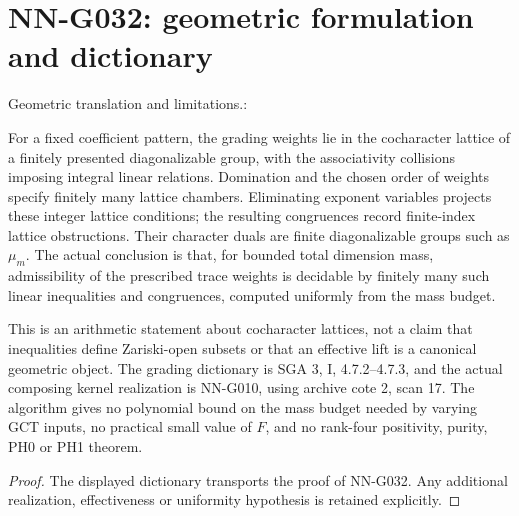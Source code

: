 \section{NN-G032: geometric formulation and dictionary}
\begin{geometricstatement}[NN-G032]
Geometric translation and limitations.:

For a fixed coefficient pattern, the grading weights lie
in the cocharacter lattice of a finitely presented
diagonalizable group, with the associativity collisions
imposing integral linear relations. Domination and the
chosen order of weights specify finitely many lattice
chambers. Eliminating exponent variables projects these
integer lattice conditions; the resulting congruences
record finite-index lattice obstructions. Their character
duals are finite diagonalizable groups such as $\mu_m$.
The actual conclusion is that, for bounded total dimension
mass, admissibility of the prescribed trace weights is
decidable by finitely many such linear inequalities and
congruences, computed uniformly from the mass budget.

This is an arithmetic statement about cocharacter lattices,
not a claim that inequalities define Zariski-open subsets
or that an effective lift is a canonical geometric object.
The grading dictionary is SGA 3, I, 4.7.2--4.7.3, and
the actual composing kernel realization is NN-G010,
using archive cote 2, scan 17. The algorithm gives no
polynomial bound on the mass budget needed by varying
GCT inputs, no practical small value of $F$, and no
rank-four positivity, purity, PH0 or PH1 theorem.



\end{geometricstatement}
\begin{proof} The displayed dictionary transports the proof of NN-G032. Any additional realization, effectiveness or uniformity hypothesis is retained explicitly.\end{proof}


